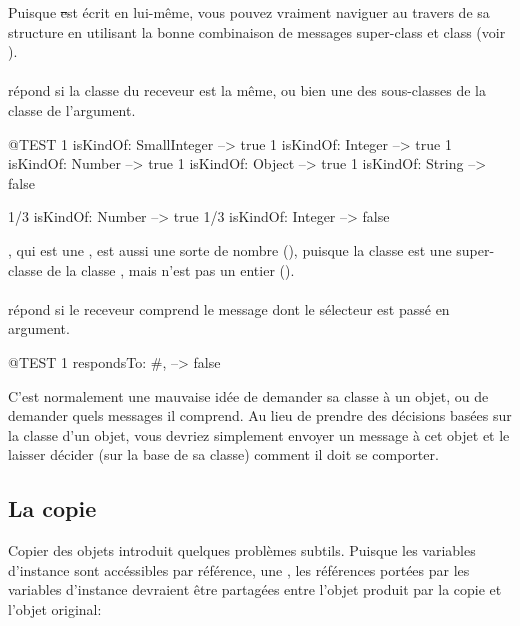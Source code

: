 \documentclass[a4paper,10pt,twoside]{book}
\begin{document}
Puisque \st est \'ecrit en lui-m\^eme, vous pouvez vraiment naviguer au travers de sa structure en utilisant la bonne combinaison de messages super-class et class (voir ). 

\paragraph{}
 r\'epond  si la classe du receveur est la m\^eme, ou bien une des sous-classes de la classe de l'argument.

\begin{code}{@TEST}
1 isKindOf: SmallInteger --> true
1 isKindOf: Integer          --> true
1 isKindOf: Number         --> true
1 isKindOf: Object           --> true
1 isKindOf: String            --> false

1/3 isKindOf: Number      --> true
1/3 isKindOf: Integer        --> false
\end{code}

, qui est une , est aussi une sorte de nombre (), puisque la classe  est une super-classe de la classe , mais  n'est pas un entier ().

\paragraph{}
 r\'epond  si le receveur comprend le message dont le s\'electeur est pass\'e en argument.

\begin{code}{@TEST}
1 respondsTo: #, --> false
\end{code}

C'est normalement une mauvaise id\'ee de demander sa classe \`a un objet, ou de demander quels messages il comprend.
Au lieu de prendre des d\'ecisions bas\'ees sur la classe d'un objet, vous devriez simplement envoyer un message \`a cet objet et le laisser d\'ecider (\ie sur la base de sa classe) comment il doit se comporter.

\subsection{La copie}

Copier des objets introduit quelques probl\`emes subtils. Puisque les variables d'instance sont acc\'essibles par r\'ef\'erence, une , les r\'ef\'erences port\'ees par les variables d'instance devraient \^etre partag\'ees entre l'objet produit par la copie et l'objet original:
\end{document}
